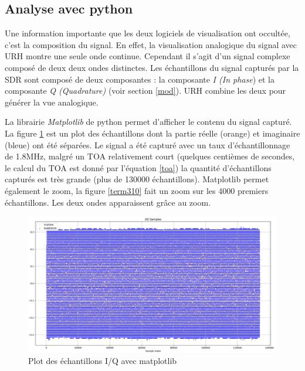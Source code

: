 \subsection{Analyse avec python}

Une information importante que les deux logiciels de visualisation ont occultée, c'est la composition du signal. En effet, la visualisation analogique du signal avec URH montre une seule onde continue. Cependant il s'agit d'un signal complexe composé de deux deux ondes distinctes. Les échantillons du signal capturés par la SDR sont composé de deux composantes : la composante \textit{I (In phase}) et la composante \textit{Q (Quadrature)} (voir section \ref{mod}). URH combine les deux pour générer la vue analogique.

\vspace{0.1cm}

La librairie \textit{Matplotlib} de python permet d'afficher le contenu du signal capturé. La figure  \ref{term309} est un plot des échantillons dont la partie réelle (orange) et imaginaire (bleue) ont été séparées. Le signal a été capturé avec un taux d'échantillonnage de 1.8MHz, malgré un TOA relativement court (quelques centièmes de secondes, le calcul du TOA est donné par l'équation \ref{toa}) la quantité d'échantillons capturés est très grande (plus de 130000 échantillons). Matplotlib permet également le zoom, la figure \ref{term310} fait un zoom sur les 4000 premiers échantillons. Les deux ondes apparaissent grâce au zoom.

\begin{figure}[h]
\centering

\includegraphics[scale=0.13]{images/iq1.png}
\caption{Plot des échantillons I/Q avec matplotlib}\label{term309}
\end{figure}



